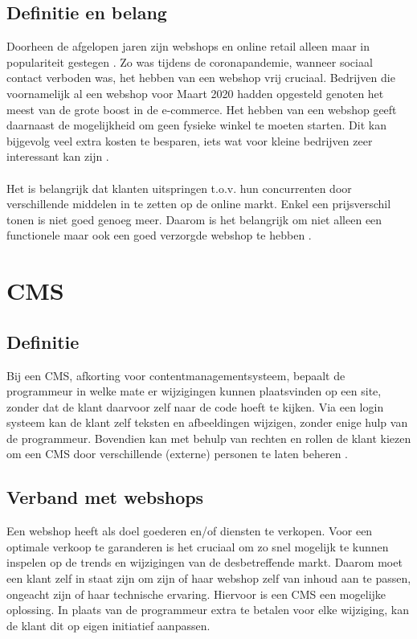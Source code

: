 \subsection{Definitie en belang}
Doorheen de afgelopen jaren zijn webshops en online retail alleen maar in populariteit gestegen \autocite{Roggeveen2020}. Zo was tijdens de coronapandemie, wanneer sociaal contact verboden was, het hebben van een webshop vrij cruciaal. Bedrijven die voornamelijk al een webshop voor Maart 2020 hadden opgesteld genoten het meest van de grote boost in de e-commerce. Het hebben van een webshop geeft daarnaast de mogelijkheid om geen fysieke winkel te moeten starten. Dit kan bijgevolg veel extra kosten te besparen, iets wat voor kleine bedrijven zeer interessant kan zijn \autocite{Beckers2021}.
\\\\
Het is belangrijk dat klanten uitspringen t.o.v. hun concurrenten door verschillende middelen in te zetten op de online markt. Enkel een prijsverschil tonen is niet goed genoeg meer. Daarom is het belangrijk om niet alleen een functionele maar ook een goed verzorgde webshop te hebben \autocite{MatthiasF.Treutner2011}.
\section{CMS}
\subsection{Definitie}
Bij een CMS, afkorting voor contentmanagementsysteem, bepaalt de programmeur in welke mate er wijzigingen kunnen plaatsvinden op een site, zonder dat de klant daarvoor zelf naar de code hoeft te kijken. Via een login systeem kan de klant zelf teksten en afbeeldingen wijzigen, zonder enige hulp van de programmeur. Bovendien kan met behulp van rechten en rollen de klant kiezen om een CMS door verschillende (externe) personen te laten beheren \autocite{Browning2001}.
\subsection{Verband met webshops}
Een webshop heeft als doel goederen en/of diensten te verkopen. Voor een optimale verkoop te garanderen is het cruciaal om zo snel mogelijk te kunnen inspelen op de trends en wijzigingen van de desbetreffende markt. Daarom moet een klant zelf in staat zijn om zijn of haar webshop zelf van inhoud aan te passen, ongeacht zijn of haar technische ervaring. Hiervoor is een CMS een mogelijke oplossing. In plaats van de programmeur extra te betalen voor elke wijziging, kan de klant dit op eigen initiatief aanpassen.
